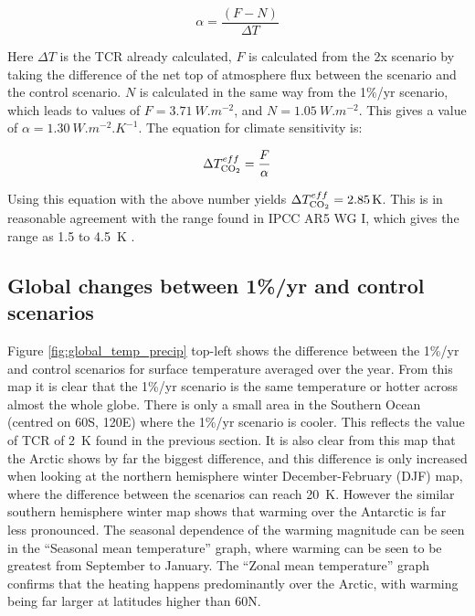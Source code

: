 \documentclass{article}
\begin{document}
\begin{equation}
    \alpha = \frac{(F - N)}{\Delta T}
    \label{eqn:alpha}
\end{equation}

Here $\Delta T$ is the TCR already calculated, $F$ is calculated from the 2x scenario by taking the difference of the net top of atmosphere flux between the scenario and the control scenario. $N$ is calculated in the same way from the 1\%/yr scenario, which leads to values of $F = \SI{3.71}{W.m^{-2}}$, and $N = \SI{1.05}{W.m^{-2}}$. This gives a value of $\alpha = \SI{1.30}{W.m^{-2}.K^{-1}}$. The equation for climate sensitivity is:

\begin{equation}
    \Delta T^{eff}_{\ce{CO2}} = \frac{F}{\alpha}
    \label{eqn:delta_t}
\end{equation}

Using this equation with the above number yields $\Delta T^{eff}_{\ce{CO2}} = \SI{2.85}{K}$. This is in reasonable agreement with the range found in IPCC AR5 WG I, which gives the range as 1.5 to \SI{4.5}{K} \parencite{ipcc2014wg1}.

\subsection{Global changes between 1\%/yr and control scenarios}


Figure \ref{fig:global_temp_precip} top-left shows the difference between the 1\%/yr and control scenarios for surface temperature averaged over the year. From this map it is clear that the 1\%/yr scenario is the same temperature or hotter across almost the whole globe. There is only a small area in the Southern Ocean (centred on 60\textdegree S, 120\textdegree E) where the 1\%/yr scenario is cooler. This reflects the value of TCR of \SI{2}{K} found in the previous section. It is also clear from this map that the Arctic shows by far the biggest difference, and this difference is only increased when looking at the northern hemisphere winter December-February (DJF) map, where the difference between the scenarios can reach \SI{20}{K}. However the similar southern hemisphere winter map shows that warming over the Antarctic is far less pronounced. The seasonal dependence of the warming magnitude can be seen in the ``Seasonal mean temperature'' graph, where warming can be seen to be greatest from September to January. The ``Zonal mean temperature'' graph confirms that the heating happens predominantly over the Arctic, with warming being far larger at latitudes higher than 60\textdegree N.
\end{document}
